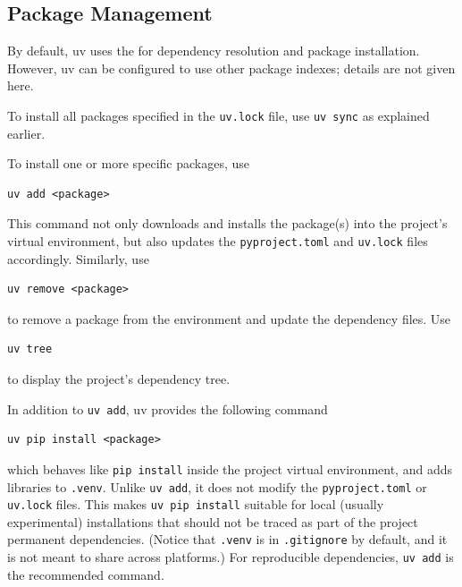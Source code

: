 \subsection{Package Management}


By default, uv uses the  for dependency resolution and package installation. However, uv can be configured to use other package indexes; details are not given here.

To install all packages specified in the \verb|uv.lock| file, use \verb|uv sync| as explained earlier.

To install one or more specific packages, use
\begin{lstlisting}
uv add <package>
\end{lstlisting}
This command not only downloads and installs the package(s) into the project’s virtual environment, but also updates the \verb|pyproject.toml| and \verb|uv.lock| files accordingly. Similarly, use
\begin{lstlisting}
uv remove <package>
\end{lstlisting}
to remove a package from the environment and update the dependency files. Use
\begin{lstlisting}
uv tree
\end{lstlisting}
to display the project’s dependency tree.

In addition to \verb|uv add|, uv provides the following command
\begin{lstlisting}
uv pip install <package>
\end{lstlisting}
which behaves like \verb|pip install| inside the project virtual environment, and adds libraries to \verb|.venv|. Unlike \verb|uv add|, it does not modify the \verb|pyproject.toml| or \verb|uv.lock| files. This makes \verb|uv pip install| suitable for local (usually experimental) installations that should not be traced as part of the project permanent dependencies. (Notice that \verb|.venv| is in \verb|.gitignore| by default, and it is not meant to share across platforms.) For reproducible dependencies, \verb|uv add| is the recommended command.
